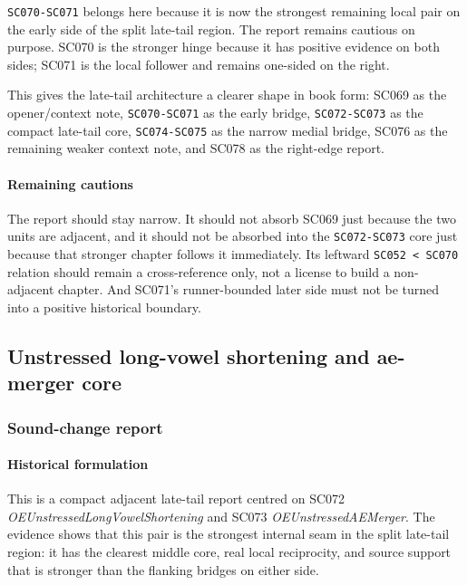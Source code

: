 \documentclass[
  british,
  a4paper,
]{article}
\begin{document}
\texttt{SC070-SC071} belongs here because it is now the strongest
remaining local pair on the early side of the split late-tail region.
The report remains cautious on purpose. SC070 is the stronger hinge
because it has positive evidence on both sides; SC071 is the local
follower and remains one-sided on the right.

This gives the late-tail architecture a clearer shape in book form:
SC069 as the opener/context note, \texttt{SC070-SC071} as the early
bridge, \texttt{SC072-SC073} as the compact late-tail core,
\texttt{SC074-SC075} as the narrow medial bridge, SC076 as the remaining
weaker context note, and SC078 as the right-edge report.

\paragraph{Remaining cautions}\label{remaining-cautions-44}

The report should stay narrow. It should not absorb SC069 just because
the two units are adjacent, and it should not be absorbed into the
\texttt{SC072-SC073} core just because that stronger chapter follows it
immediately. Its leftward \texttt{SC052\ \textless{}\ SC070} relation
should remain a cross-reference only, not a license to build a
non-adjacent chapter. And SC071's runner-bounded later side must not be
turned into a positive historical boundary.

\subsection{Unstressed long-vowel shortening and ae-merger
core}\label{unstressed-long-vowel-shortening-and-ae-merger-core}

\subsubsection{Sound-change report}\label{sound-change-report-45}

\paragraph{Historical formulation}\label{historical-formulation-45}

This is a compact adjacent late-tail report centred on SC072
\emph{OEUnstressedLongVowelShortening} and SC073
\emph{OEUnstressedAEMerger}. The evidence shows that this pair is the
strongest internal seam in the split late-tail region: it has the
clearest middle core, real local reciprocity, and source support that is
stronger than the flanking bridges on either side.
\end{document}
